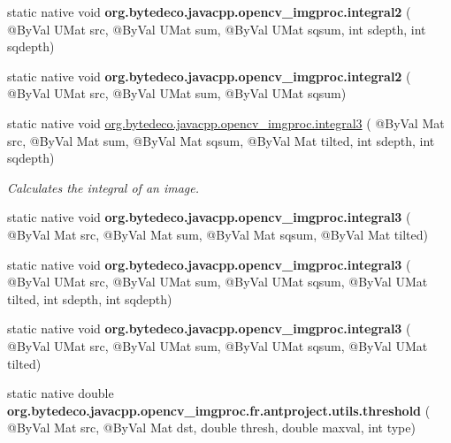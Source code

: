 \begin{DoxyCompactItemize}
\item 
\mbox{\label{group__imgproc__misc_ga4041209a63193bc347e6703a0f238cfa}} 
static native void {\bfseries org.\+bytedeco.\+javacpp.\+opencv\+\_\+imgproc.\+integral2} ( @By\+Val U\+Mat src, @By\+Val U\+Mat sum, @By\+Val U\+Mat sqsum, int sdepth, int sqdepth)
\item 
\mbox{\label{group__imgproc__misc_gae84de723faf3a16192e9edbcbff612e2}} 
static native void {\bfseries org.\+bytedeco.\+javacpp.\+opencv\+\_\+imgproc.\+integral2} ( @By\+Val U\+Mat src, @By\+Val U\+Mat sum, @By\+Val U\+Mat sqsum)
\item 
static native void \hyperlink{group__imgproc__misc_gaac16fc19a4025e3133ded033405c8e25}{org.\+bytedeco.\+javacpp.\+opencv\+\_\+imgproc.\+integral3} ( @By\+Val Mat src, @By\+Val Mat sum, @By\+Val Mat sqsum, @By\+Val Mat tilted, int sdepth, int sqdepth)
\begin{DoxyCompactList}\small\item\em Calculates the integral of an image. \end{DoxyCompactList}\item 
\mbox{\label{group__imgproc__misc_ga92068d61245a7988473977ede383e619}} 
static native void {\bfseries org.\+bytedeco.\+javacpp.\+opencv\+\_\+imgproc.\+integral3} ( @By\+Val Mat src, @By\+Val Mat sum, @By\+Val Mat sqsum, @By\+Val Mat tilted)
\item 
\mbox{\label{group__imgproc__misc_ga832a2f23a1570c99b2b26511b0cdcaef}} 
static native void {\bfseries org.\+bytedeco.\+javacpp.\+opencv\+\_\+imgproc.\+integral3} ( @By\+Val U\+Mat src, @By\+Val U\+Mat sum, @By\+Val U\+Mat sqsum, @By\+Val U\+Mat tilted, int sdepth, int sqdepth)
\item 
\mbox{\label{group__imgproc__misc_gad8327462a83b60bb6760130438f8572a}} 
static native void {\bfseries org.\+bytedeco.\+javacpp.\+opencv\+\_\+imgproc.\+integral3} ( @By\+Val U\+Mat src, @By\+Val U\+Mat sum, @By\+Val U\+Mat sqsum, @By\+Val U\+Mat tilted)
\item 
\mbox{\label{group__imgproc__misc_gad4a3818694ba0a8e1897cd241eaf47fe}} 
static native double {\bfseries org.\+bytedeco.\+javacpp.\+opencv\+\_\+imgproc.\+fr.antproject.utils.threshold} ( @By\+Val Mat src, @By\+Val Mat dst, double thresh, double maxval, int type)

\end{DoxyCompactItemize}
